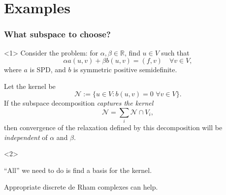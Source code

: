 \documentclass[presentation,aspectratio=43,10pt]{beamer}
\begin{document}
\section{Examples}

\begin{frame}
  \frametitle{What subspace to choose?}
  \begin{onlyenv}<1> Consider the problem: for
    $\alpha, \beta \in \mathbb{R}$, find $u \in V$ such that
    \begin{equation*}
      \alpha a(u, v) + \beta b(u, v) = (f, v) \quad \forall v \in V,
    \end{equation*}
    where $a$ is SPD, and $b$ is symmetric positive semidefinite.
  \end{onlyenv}
  \begin{theorem}
    Let the kernel be
    \begin{equation*}
      \mathcal{N} := \{ u \in V : b(u, v) = 0 \,\, \forall v \in V \}.
    \end{equation*}
    If the subspace decomposition \emph{captures the kernel}
    \begin{equation*}
      \mathcal{N} = \sum_i \mathcal{N} \cap V_i,
    \end{equation*}
    then convergence of the relaxation defined by this decomposition
    will be \emph{independent} of $\alpha$ and $\beta$.
    \nocite{Schoeberl:1999,Lee:2007}
  \end{theorem}
  \begin{onlyenv}<2>
    \begin{corollary}
      ``All'' we need to do is find a basis for the kernel.

      Appropriate discrete de Rham complexes can help.
    \end{corollary}
  \end{onlyenv}
\end{frame}
\end{document}
